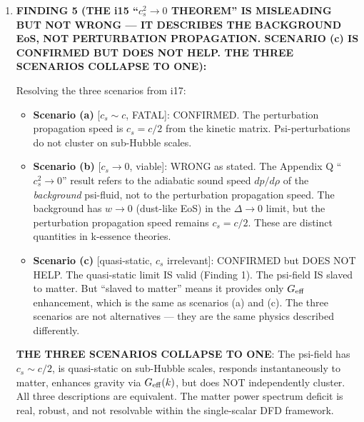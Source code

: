 \documentclass[11pt]{article}
\newcommand{\Geff}{G_{\rm eff}}
\begin{document}
\begin{tcolorbox}[colback=blue!5!white, colframe=blue!70!black,
  title=\textbf{W4i18 TOP 5 FINDINGS --- QUASI-STATIC REGIME PROOF}]
\begin{enumerate}
  \textbf{The Sawicki-Bellini criterion} (2015): The quasi-static
  approximation is valid inside the dark field's sound horizon. For
  DFD, the sound horizon is $\sim d_H/2$, so the QSA is valid on
  all sub-Hubble scales (confirming Finding 1). But validity of the
  QSA means precisely that the field does not independently cluster
  --- it is slaved to the matter distribution.

  \textbf{For comparison}: CDM has $c_s = 0$, so its sound horizon
  is zero. The QSA is never valid for CDM perturbations (they evolve
  dynamically, not quasi-statically). This dynamic evolution is what
  allows CDM to grow potential wells independently of baryons.

\item \textbf{FINDING 5 (THE i15 ``$c_s^2 \to 0$ THEOREM'' IS MISLEADING
  BUT NOT WRONG --- IT DESCRIBES THE BACKGROUND EoS, NOT PERTURBATION
  PROPAGATION. SCENARIO (c) IS CONFIRMED BUT DOES NOT HELP.
  THE THREE SCENARIOS COLLAPSE TO ONE):}

  Resolving the three scenarios from i17:
  \begin{itemize}[nosep]
  \item \textbf{Scenario (a)} [$c_s \sim c$, FATAL]: CONFIRMED.
    The perturbation propagation speed is $c_s = c/2$ from the kinetic
    matrix. Psi-perturbations do not cluster on sub-Hubble scales.

  \item \textbf{Scenario (b)} [$c_s \to 0$, viable]: WRONG as stated.
    The Appendix Q ``$c_s^2 \to 0$'' result refers to the adiabatic
    sound speed $dp/d\rho$ of the \textit{background} psi-fluid,
    not to the perturbation propagation speed. The background has
    $w \to 0$ (dust-like EoS) in the $\Delta \to 0$ limit, but the
    perturbation propagation speed remains $c_s = c/2$. These are
    distinct quantities in k-essence theories.

  \item \textbf{Scenario (c)} [quasi-static, $c_s$ irrelevant]:
    CONFIRMED but DOES NOT HELP. The quasi-static limit IS valid
    (Finding 1). The psi-field IS slaved to matter. But ``slaved
    to matter'' means it provides only $\Geff$ enhancement, which
    is the same as scenarios (a) and (c). The three scenarios
    are not alternatives --- they are the same physics described
    differently.
  \end{itemize}

  \textbf{THE THREE SCENARIOS COLLAPSE TO ONE}: The psi-field has
  $c_s \sim c/2$, is quasi-static on sub-Hubble scales, responds
  instantaneously to matter, enhances gravity via $\Geff(k)$, but
  does NOT independently cluster. All three descriptions are
  equivalent. The matter power spectrum deficit is real, robust, and
  not resolvable within the single-scalar DFD framework.


\end{enumerate}
\end{tcolorbox}
\end{document}
